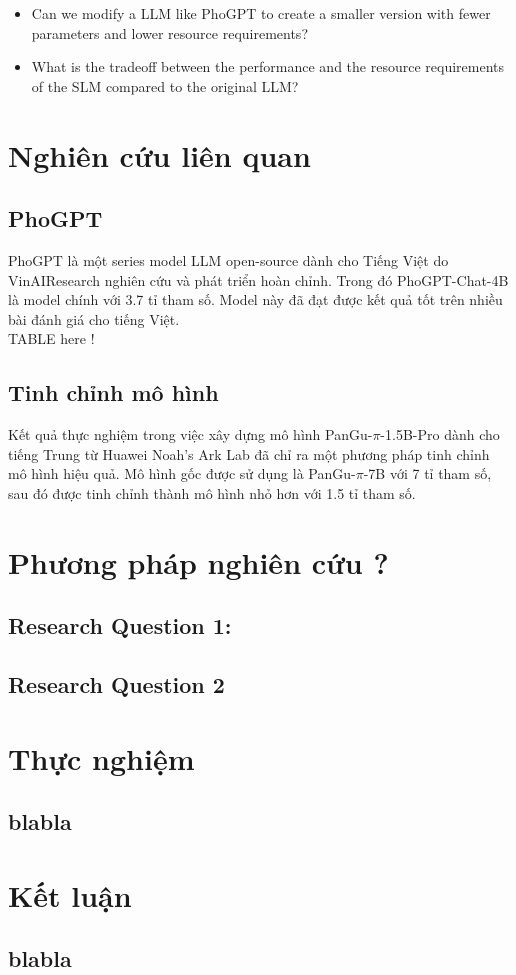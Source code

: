\documentclass{uetgraduation}
\begin{document}
\begin{itemize}
    \item Can we modify a LLM like PhoGPT to create a smaller version with fewer parameters and lower resource requirements?
    \item What is the tradeoff between the performance and the resource requirements of the SLM compared to the original LLM?
\end{itemize}

\chapter{Nghiên cứu liên quan}
\section{PhoGPT}
PhoGPT là một series model LLM open-source dành cho Tiếng Việt do VinAIResearch nghiên cứu và phát triển hoàn chỉnh. Trong đó PhoGPT-Chat-4B là model chính với 3.7 tỉ tham số. Model này đã đạt được kết quả tốt trên nhiều bài đánh giá cho tiếng Việt. \\

TABLE here ! \\

\section{Tinh chỉnh mô hình}
Kết quả thực nghiệm trong việc xây dựng mô hình PanGu-$\pi$-1.5B-Pro dành cho tiếng Trung từ Huawei Noah's Ark Lab đã chỉ ra một phương pháp tinh chỉnh mô hình hiệu quả. Mô hình gốc được sử dụng là PanGu-$\pi$-7B với 7 tỉ tham số, sau đó được tinh chỉnh thành mô hình nhỏ hơn với 1.5 tỉ tham số. 


\chapter{Phương pháp nghiên cứu ?}
\section{Research Question 1:}
\section{Research Question 2}

\chapter{Thực nghiệm}
\section{blabla}

\chapter{Kết luận}
\section{blabla}
\end{document}

